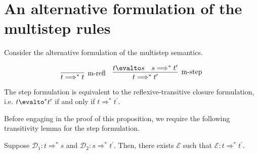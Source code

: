 \documentclass[11pt,letterpaper]{article}
\begin{document}
\section{An alternative formulation of the multistep rules}

Consider the alternative formulation of the multistep semantics.
%
\newcommand{\altevalto}{\Longrightarrow}

\begin{equation*}
    \infer[\text{m-refl}]{t \altevalto^* t}{}
    \quad
    \infer[\text{m-step}]{t \altevalto^* t^\prime}{
        t \evalto s
        &
        s \altevalto^* t^\prime
    }
\end{equation*}

\begin{prop}
    The step formulation is equivalent to the reflexive-transitive
    closure formulation, i.e.
    $t \evalto^* t^\prime$ if and only if $t \altevalto^* t^\prime$.
\end{prop}

Before engaging in the proof of this proposition, we require the following
transitivity lemma for the step formulation.

\begin{lem}[Transitivity]
    Suppose $\mathcal{D}_1 : t \altevalto^* s$
    and $\mathcal{D}_2 : s \altevalto^* t^\prime$.
    Then, there exists $\mathcal{E}$
    such that $\mathcal{E} : t \altevalto^* t^\prime$.
\end{lem}
\end{document}
